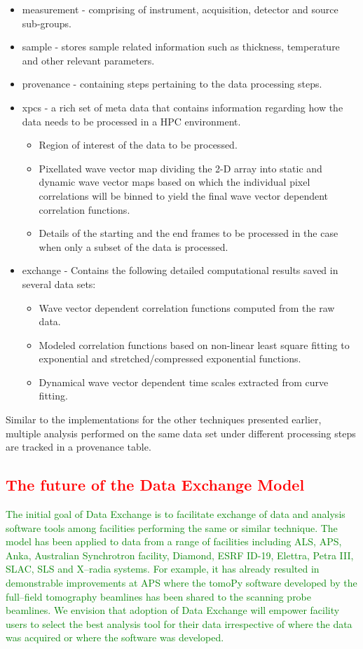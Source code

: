 \documentclass[pdf]{iucr}              %
\begin{document}
\begin{itemize}
\item measurement - comprising of instrument, acquisition, detector and source sub-groups.
\item sample - stores sample related information such as thickness, temperature and other relevant parameters.
\item provenance - containing steps pertaining to the data processing steps.
\item xpcs - a rich set of meta data that contains information regarding how the data needs to be processed in a HPC environment.
	\begin{itemize}
	\item Region of interest of the data to be processed.
	\item Pixellated wave vector map dividing the 2-D array into static and dynamic wave vector maps based on which the individual pixel correlations will be binned to yield the final wave vector dependent correlation functions.
	\item Details of the starting and the end frames to be processed in the case when only a subset of the data is processed.
	\end{itemize}

\item exchange - Contains the following detailed computational results saved in several data sets:
	\begin{itemize}
		\item Wave vector dependent correlation functions computed from the raw data.
		\item Modeled correlation functions based on non-linear least square fitting to exponential and stretched/compressed exponential functions.
		\item Dynamical wave vector dependent time scales extracted from curve fitting.
	\end{itemize}
\end{itemize}

Similar to the implementations for the other techniques presented earlier, multiple analysis performed on the same data set under different processing steps are tracked in a provenance table.

\textcolor{red}{\section{The future of the Data Exchange Model}}

\textcolor{green}{The initial goal of Data Exchange is to facilitate exchange of data and analysis software tools among facilities performing the same or similar technique. The model has been applied to data from a range of facilities including ALS, APS, Anka, Australian Synchrotron facility, Diamond, ESRF ID-19, Elettra, Petra III, SLAC, SLS and X--radia systems. For example, it has already resulted in demonstrable improvements at APS where the tomoPy software developed by the full--field tomography beamlines has been shared to the scanning probe beamlines. We envision that adoption of Data Exchange will empower facility users to select the best analysis tool for their data irrespective of where the data was acquired or where the software was developed.}
\end{document}
